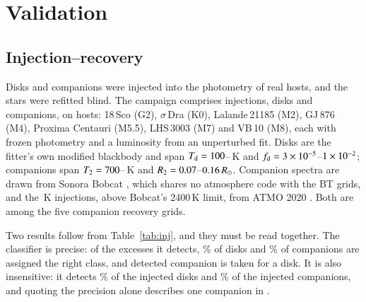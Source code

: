 \documentclass{aa}
\newcommand{\Rsun}{R_\odot}
\begin{document}
\section{Validation}
\label{sec:validation}

\subsection{Injection--recovery}
\label{sec:inj}

Disks and companions were injected into the photometry of real hosts, and the
stars were refitted blind. The campaign
comprises \nInj{} injections, \nInjDisk{} disks and \nInjComp{} companions, on \nInjHosts{} hosts:
18\,Sco (G2), $\sigma$\,Dra (K0), Lalande\,21185 (M2), GJ\,876 (M4), Proxima
Centauri (M5.5), LHS\,3003 (M7) and VB\,10 (M8), each with frozen photometry and a
luminosity from an unperturbed fit. Disks are the fitter's own modified
blackbody and span $T_{\rm d} = 100$--\injTdMax\,K and
$f_{\rm d} = 3\times10^{-5}$--$1\times10^{-2}$; companions span $T_2 = 700$--\injTtwoMax\,K and
$R_2 = 0.07$--$\injRtwoMax\,\Rsun$. Companion spectra are drawn from Sonora
Bobcat \citep{marley2021}, which shares no atmosphere code with the BT grids, and
the \injAtmoTmin\,K injections, above Bobcat's 2400\,K limit, from ATMO 2020
\citep{phillips2020}. Both are among the five companion recovery grids.

\begin{table}
\caption{Injection--recovery. Recall depends strongly on the conditioning set.}
\label{tab:inj}
\centering

\end{table}

Two results follow from Table~\ref{tab:inj}, and they must be read together.
The classifier is precise: of the excesses it detects, \injDiskDeclaredPct\% of disks and
\injCompDeclaredPct\% of companions are assigned the right class, and \injCompAsDiskDet{} detected companion is
taken for a disk. It is also insensitive: it detects \injDiskFlagPctInt\% of the injected disks
and \injCompFlagPct\% of the injected companions, and quoting the precision alone describes
one companion in \injCompOneIn.
\end{document}
